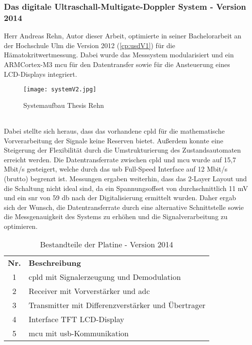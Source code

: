 \subsubsection*{Das digitale Ultraschall-Multigate-Doppler System - Version 2014}\label{cp:usdV2}
Herr Andreas Rehn, Autor dieser Arbeit, optimierte in seiner Bachelorarbeit an der Hochschule Ulm die Version 2012 (\autoref{cp:usdV1}) für die Hämatokritwertmessung. Dabei wurde das Messsystem modularisiert und ein ARM\SymbReg Cortex\SymbReg-M3 \ac{mcu} für den Datentransfer sowie für die Ansteuerung eines LCD-Displays integriert.
\begin{figure}[h!t]
\centering
\begin{annotatedFigure}
	{\texttt{[image: systemV2.jpg]}}
	
\end{annotatedFigure}  	
	\caption{Systemaufbau Thesis Rehn}
  	\label{fig:system_stemp}
\end{figure}\\
Dabei stellte sich heraus, dass das vorhandene \ac{cpld} für die mathematische Vorverarbeitung der Signale keine Reserven bietet. Außerdem konnte eine Steigerung der Flexibilität durch die Umstrukturierung des Zustandsautomaten erreicht werden. Die Datentransferrate zwischen \ac{cpld} und \ac{mcu} wurde auf 15,7 Mbit/s gesteigert, welche durch das \ac{usb} Full-Speed Interface auf 12 Mbit/s (brutto) begrenzt ist. Messungen ergaben weiterhin, dass das 2-Layer Layout und die Schaltung nicht ideal sind, da ein Spannungsoffset von durchschnittlich 11 mV und ein \ac{snr} von 59 \ac{db} nach der Digitalisierung ermittelt wurden. Daher ergab sich der Wunsch, die Datentransferrate durch eine alternative Schnittstelle sowie die Messgenauigkeit des Systems zu erhöhen und die Signalverarbeitung zu optimieren.\cite{rehn2014}

\begin{table}[h]
\centering
\caption{Bestandteile der Platine - Version 2014}
\label{tab:system_stemp_tab}
\begin{tabular}{c|l}
\textbf{Nr.} & \textbf{Beschreibung} \\
\cline{1-2}
1 & \ac{cpld} mit Signalerzeugung und Demodulation\\ 
2 & Receiver mit Vorverstärker und \ac{adc}\\
3 & Transmitter mit Differenzverstärker und Übertrager\\
4 & Interface TFT LCD-Display\\
5 & \ac{mcu} mit \ac{usb}-Kommunikation\\
\end{tabular}
\end{table}
%
%
%
